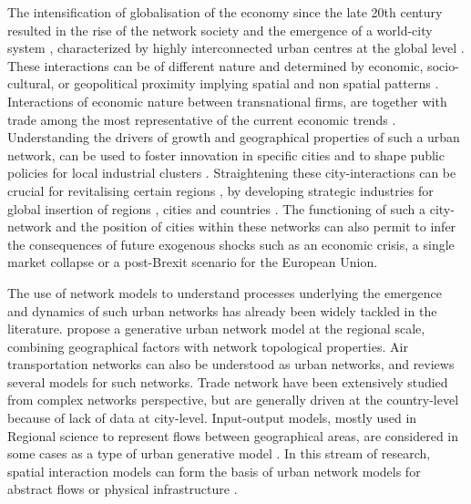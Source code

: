 \documentclass[11pt]{article}
\begin{document}
The intensification of globalisation of the economy since the late 20th century resulted in the rise of the network society \citep{castells2000networksociety} and the emergence of a world-city system \citep{taylor2001specification}, characterized by highly interconnected urban centres at the global level \citep{sassen1991}. These interactions can be of different nature and determined by economic, socio-cultural, or geopolitical proximity implying spatial and non spatial patterns \citep{martinus2018global}. Interactions of economic nature between transnational firms, are together with trade among the most representative of the current economic trends \citep{taylor2001specification}. Understanding the drivers of growth and geographical properties of such a urban network, can be used to foster innovation in specific cities and to shape public policies for local industrial clusters \citep{turkina2016structure}. Straightening these city-interactions can be crucial for revitalising certain regions \cite{Clarke2018}, by developing strategic industries for global insertion of regions \cite{dawley2019creating}, cities \cite{gluckler2016relational} and countries \cite{martinus2019brokerage}. The functioning of such a city-network and the position of cities within these networks \cite{gluckler2016relational} can also permit to infer the consequences of future exogenous shocks such as an economic crisis, a single market collapse or a post-Brexit scenario for the European Union.

The use of network models to understand processes underlying the emergence and dynamics of such urban networks has already been widely tackled in the literature. \cite{dai2016simulating} propose a generative urban network model at the regional scale, combining geographical factors with network topological properties. Air transportation networks can also be understood as urban networks, and \cite{zanin2013modelling} reviews several models for such networks. Trade network have been extensively studied from complex networks perspective, but are generally driven at the country-level \cite{garlaschelli2005structure} because of lack of data at city-level. Input-output models, mostly used in Regional science to represent flows between geographical areas, are considered in some cases as a type of urban generative model \cite{jin1993generation}. In this stream of research, spatial interaction models \cite{dennett2013multilevel} can form the basis of urban network models for abstract flows \cite{dai2016generative} or physical infrastructure \cite{raimbault2020indirect}.
\end{document}

